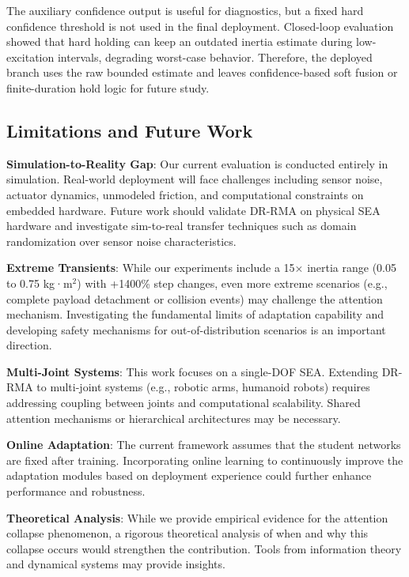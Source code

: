 \documentclass[lettersize,journal]{IEEEtran}
\begin{document}
The auxiliary confidence output is useful for diagnostics, but a fixed hard confidence threshold is not used in the final deployment. Closed-loop evaluation showed that hard holding can keep an outdated inertia estimate during low-excitation intervals, degrading worst-case behavior. Therefore, the deployed branch uses the raw bounded estimate and leaves confidence-based soft fusion or finite-duration hold logic for future study.

\subsection{Limitations and Future Work}

\textbf{Simulation-to-Reality Gap}: Our current evaluation is conducted entirely in simulation. Real-world deployment will face challenges including sensor noise, actuator dynamics, unmodeled friction, and computational constraints on embedded hardware. Future work should validate DR-RMA on physical SEA hardware and investigate sim-to-real transfer techniques such as domain randomization over sensor noise characteristics.

\textbf{Extreme Transients}: While our experiments include a 15× inertia range (0.05 to 0.75 kg·m$^2$) with +1400\% step changes, even more extreme scenarios (e.g., complete payload detachment or collision events) may challenge the attention mechanism. Investigating the fundamental limits of adaptation capability and developing safety mechanisms for out-of-distribution scenarios is an important direction.

\textbf{Multi-Joint Systems}: This work focuses on a single-DOF SEA. Extending DR-RMA to multi-joint systems (e.g., robotic arms, humanoid robots) requires addressing coupling between joints and computational scalability. Shared attention mechanisms or hierarchical architectures may be necessary.

\textbf{Online Adaptation}: The current framework assumes that the student networks are fixed after training. Incorporating online learning to continuously improve the adaptation modules based on deployment experience could further enhance performance and robustness.

\textbf{Theoretical Analysis}: While we provide empirical evidence for the attention collapse phenomenon, a rigorous theoretical analysis of when and why this collapse occurs would strengthen the contribution. Tools from information theory and dynamical systems may provide insights.
\end{document}

